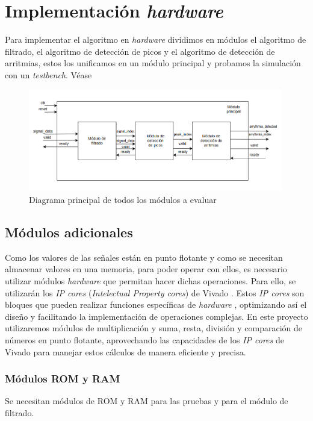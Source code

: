 \chapter{Implementación  \textit{hardware} }

Para implementar el algoritmo en  \textit{hardware}  dividimos en módulos el algoritmo de filtrado, el algoritmo
de detección de picos y el algoritmo de detección de arritmias, estos los unificamos en un módulo principal 
y probamos la simulación con un \textit{testbench}. Véase 

\begin{figure}[h!]
    \centering
    \includegraphics[width=0.99\textwidth]{./Images/img_res_experimentales/diagramaGeneral.png}
    \caption{Diagrama principal de todos los módulos a evaluar}
    \label{fig:diagramaGeneral}
\end{figure} 




\section{Módulos adicionales} 

Como los valores de las señales están en punto flotante y como se necesitan almacenar valores en una memoria, para poder operar con ellos, es necesario utilizar módulos  \textit{hardware}  que permitan hacer dichas operaciones. Para ello, se utilizarán los \textit{IP cores} (\textit{Intelectual Property cores}) de Vivado \cite{xilinx_ip_cores}. Estos \textit{IP cores} son bloques que pueden realizar funciones específicas de  \textit{hardware} , optimizando así el diseño y facilitando la implementación de operaciones complejas. En este proyecto utilizaremos módulos de multiplicación y suma, resta, división y comparación de números en punto flotante, aprovechando las capacidades de los \textit{IP cores} de Vivado para manejar estos cálculos de manera eficiente y precisa.
\subsection{Módulos ROM y RAM}
 Se necesitan módulos de ROM y RAM para las pruebas y para el módulo de filtrado.


